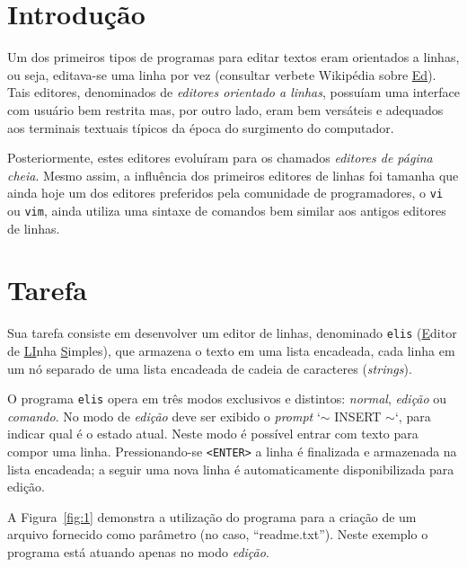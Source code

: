 \documentclass[11pt,a4paper]{article}
\begin{document}
\pagebreak
\section{Introdução}
\label{subsec:parteI:descricao}

Um dos primeiros tipos de programas para editar textos eram orientados a linhas,
ou seja, editava-se uma linha por vez (consultar verbete Wikipédia sobre
\href{http://en.wikipedia.org/wiki/Ed_(text_editor)}{Ed}).
Tais editores, denominados de \emph{editores orientado a linhas}, possuíam uma interface
com usuário bem restrita mas, por outro lado, eram bem versáteis e
adequados aos terminais textuais típicos da época do surgimento do computador.

Posteriormente, estes editores evoluíram para os chamados \emph{editores de página cheia}.
Mesmo assim, a influência dos primeiros editores de linhas foi tamanha que ainda
hoje um dos editores preferidos pela comunidade de programadores, o \texttt{vi} ou \texttt{vim}, ainda
utiliza uma sintaxe de comandos bem similar aos antigos editores de linhas.

\section{Tarefa}
\label{subsec:tarefa_parteI}

Sua tarefa consiste em desenvolver um editor de linhas, denominado
\texttt{elis} (\uline{E}ditor de \uline{LI}nha \uline{S}imples),
que armazena o texto em uma lista encadeada, cada linha em um nó separado de uma
lista encadeada de cadeia de caracteres (\emph{strings}).

O programa \texttt{elis} opera em três modos exclusivos e distintos:
\textsl{normal}, \textsl{edição} ou \textsl{comando}.
No modo de \textsl{edição} deve ser exibido o \emph{prompt} `$\sim$ INSERT $\sim$`, para indicar qual é o estado atual. Neste modo é possível entrar com texto para compor uma linha.
Pressionando-se \texttt{<ENTER>} a linha é finalizada e armazenada na lista
encadeada; a seguir uma nova linha é automaticamente disponibilizada para edição.

A Figura~\ref{fig:1} demonstra a utilização do programa para a criação
de um arquivo fornecido como parâmetro (no caso, ``readme.txt'').
Neste exemplo o programa está atuando apenas no modo \textsl{edição}.
\end{document}
